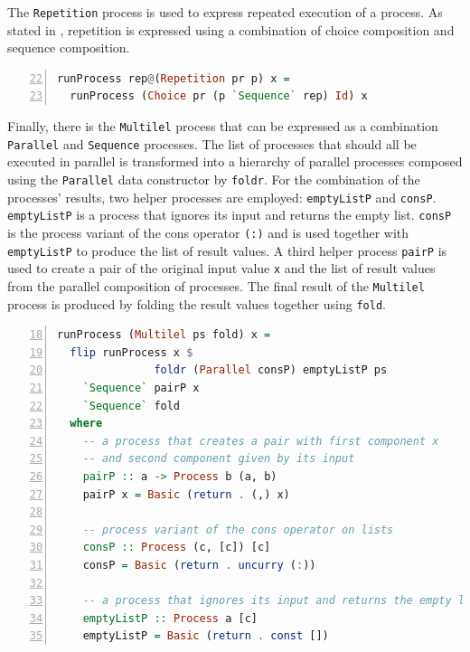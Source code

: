 The \texttt{Repetition} process is used to express repeated execution of a process. As stated in , repetition is expressed using a combination of choice composition and sequence composition.
\begin{lstlisting}[language=Haskell,caption=Implementation of the interpreter for \texttt{Repetition} processes.,numbers=left,frame=bt,firstnumber=22]
runProcess rep@(Repetition pr p) x =
  runProcess (Choice pr (p `Sequence` rep) Id) x
\end{lstlisting}

Finally, there is the \texttt{Multilel} process that can be expressed as a combination \texttt{Parallel} and \texttt{Sequence} processes. The list of processes that should all be executed in parallel is transformed into a hierarchy of parallel processes composed using the \texttt{Parallel} data constructor by \texttt{foldr}. For the combination of the processes' results, two helper processes are employed: \texttt{emptyListP} and \texttt{consP}. \texttt{emptyListP} is a process that ignores its input and returns the empty list. \texttt{consP} is the process variant of the cons operator \texttt{(:)} and is used together with \texttt{emptyListP} to produce the list of result values. A third helper process \texttt{pairP} is used to create a pair of the original input value \texttt{x} and the list of result values from the parallel composition of processes. The final result of the \texttt{Multilel} process is produced by folding the result values together using \texttt{fold}.
\begin{lstlisting}[language=Haskell,caption=Implementation of the interpreter for \texttt{Multilel} processes.,label=lst:local_runprocess_multilel,numbers=left,frame=bt,firstnumber=18]
runProcess (Multilel ps fold) x =
  flip runProcess x $
               foldr (Parallel consP) emptyListP ps 
    `Sequence` pairP x
    `Sequence` fold
  where
    -- a process that creates a pair with first component x
    -- and second component given by its input
    pairP :: a -> Process b (a, b)
    pairP x = Basic (return . (,) x)
 
    -- process variant of the cons operator on lists
    consP :: Process (c, [c]) [c]
    consP = Basic (return . uncurry (:))

    -- a process that ignores its input and returns the empty list
    emptyListP :: Process a [c]
    emptyListP = Basic (return . const [])
\end{lstlisting}


